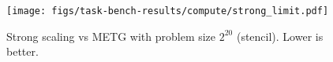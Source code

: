 \begin{figure}[t]
\centering
\texttt{[image: figs/task-bench-results/compute/strong\_limit.pdf]}
\vspace{-0.6cm}
\caption{\color{blue} Strong scaling vs METG with problem size $2^{20}$ (stencil). Lower is better.\label{fig:strong-scaling}}
\vspace{-0.35cm}
\end{figure}
